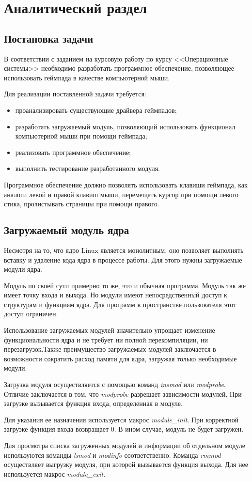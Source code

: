 \section{Аналитический раздел}
\subsection{Постановка задачи}
В соответствии с заданием на курсовую работу по курсу <<Операционные системы>> необходимо разработать программное обеспечение,
позволяющее использовать геймпада в качестве компьютерной мыши.\par
Для реализации поставленной задачи требуется:
\begin{itemize}
	\item проанализировать существующие драйвера геймпадов;
	\item разработать загружаемый модуль, позволяющий использовать функционал компьютерной мыши
	при помощи геймпада;
	\item реализовать программное обеспечение;
	\item выполнить тестирование разработанного модуля.
\end{itemize}
Программное обеспечение должно позволять использовать клавиши геймпада, как аналоги левой и правой клавиш мыши, перемещать курсор при помощи левого стика, пролистывать страницы при помощи правого.\par

\subsection{Загружаемый модуль ядра}
Несмотря на то, что ядро Linux является монолитным, оно позволяет
выполнять вставку и удаление кода ядра в процессе работы. Для этого нужны загружаемые модули ядра.\par
Модуль по своей сути примерно то же, что и обычная программа. Модуль
так же имеет точку входа и выхода. Но
модули имеют непосредственный доступ к структурам и функциям ядра. Для
программ в пространстве пользователя этот доступ ограничен\cite{soloviev}.\par
Использование загружаемых модулей значительно упрощает изменение
функциональности ядра и не требует ни полной перекомпиляции, ни перезагрузок.Также преимущество загружаемых модулей заключается в возможности сократить расход памяти для ядра, загружая только
необходимые модули.\par
Загрузка модуля осуществляется с помощью команд \textit{insmod} или
\textit{modprobe}. Отличие заключается в том, что \textit{modprobe} разрешает зависимости
модулей. При загрузке вызывается функция входа, определенная в модуле.\par
Для указания ее назначения используется макрос \textit{module\_init}. При корректной
загрузке функция входа возвращает 0. В ином случае, модуль не будет
загружен.\par
Для просмотра списка загруженных модулей и информации об
отдельном модуле используются команды \textit{lsmod} и \textit{modinfo} соответственно.
Команда \textit{rmmod} осуществляет выгрузку модуля, при которой
вызывается функция выхода. Для нее используется макрос \textit{module\_exit}.

